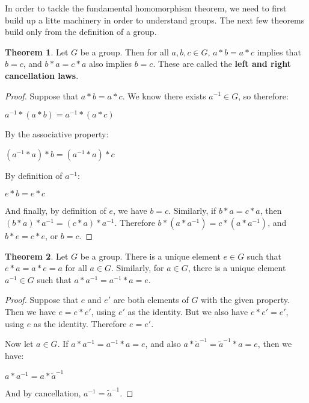 \documentclass{article}
\newcommand{\inv}[1]{#1^{-1}}
\theoremstyle{definition}
\newtheorem{theorem}{Theorem}[section]
\begin{document}
In order to tackle the fundamental homomorphism theorem, we need to first build up a litte machinery in order to understand groups. The next few theorems build only from the definition of a group.

\theoremstyle{definition}
\begin{theorem}
Let $G$ be a group. Then for all $a, b, c \in G$, $a * b = a * c$ implies that $b = c$, and $b*a = c*a$ also implies $b=c$. These are called the \textbf{left and right cancellation laws}.
\end{theorem}

\begin{proof}
Suppose that $a*b = a*c$. We know there exists $\inv{a} \in G$, so therefore:

\begin{center}
    $\inv{a} * (a*b) = \inv{a} * (a*c)$
\end{center}

By the associative property:

\begin{center}
    $(\inv{a} * a) * b = (\inv{a} * a) * c$
\end{center}

By definition of $\inv{a}$:

\begin{center}
    $e * b = e * c$
\end{center}

And finally, by definition of $e$, we have $b = c$. Similarly, if $b*a = c*a$, then $(b*a)*\inv{a} = (c*a)*\inv{a}$. Therefore $b*(a*\inv{a}) = c*(a*\inv{a})$, and $b*e = c*e$, or $b = c$.

\end{proof}

\theoremstyle{definition}
\begin{theorem}
Let $G$ be a group. There is a unique element $e \in G$ such that $e*a = a*e = a$ for all $a \in G$. Similarly, for $a \in G$, there is a unique element $\inv{a} \in G$ such that $a*\inv{a} = \inv{a}*a = e$.
\end{theorem}

\begin{proof}
Suppose that $e$ and $e'$ are both elements of $G$ with the given property. Then we have $e = e*e'$, using $e'$ as the identity. But we also have $e*e' = e'$, using $e$ as the identity. Therefore $e = e'$.

Now let $a \in G$. If $a*\inv{a} = \inv{a}*a = e$, and also $a*\inv{\tilde{a}} = \inv{\tilde{a}}*a = e$, then we have:

\begin{center}
    $a*\inv{a} = a*{\inv{\tilde{a}}}$
\end{center}

And by cancellation, $\inv{a} = \inv{\tilde{a}}$.

\end{proof}
\end{document}
